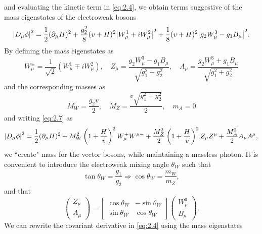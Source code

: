 and evaluating the kinetic term in \eqref{eq:2.4}, we obtain terms suggestive of the mass eigenstates of the electroweak bosons
\begin{equation}
    \label{eq:2.7}
    \abs{D_{\mu}\phi} ^2 = \frac{1}{2}(\partial_{\mu}H)^2 + \frac{g_2^2}{8}(v+H)^2\abs{W_{\mu}^1 + iW_{\mu}^2}^2 + \frac{1}{8}(v+H)^2\abs{g_2W_{\mu}^3-g_1B_{\mu}}^2.
\end{equation}
By defining the mass eigenstates as
\begin{equation}
    \label{eq:2.8}
    W^{\pm}_{\mu}= \frac{1}{\sqrt{2}}(W_{\mu}^1\mp iW_{\mu}^2), \quad Z_{\mu} = \frac{g_2W_{\mu}^3-g_1B_{\mu}}{\sqrt{g_1^2+g_2^2}}, \quad A_{\mu} = \frac{g_2W_{\mu}^3 + g_1B_{\mu}}{\sqrt{g_1^2+g_2^2}}
\end{equation}
and the corresponding masses as
\begin{equation}
    \label{eq:2.9}
    M_W = \frac{g_2v}{2}, \quad M_Z = \frac{v\sqrt{g_1^2+g_2^2}}{2}, \quad m_A = 0
\end{equation}
and writing \eqref{eq:2.7} as
\begin{equation}
    \label{eq:2.10}
    \abs{D_{\mu}\phi} ^2 = \frac{1}{2}(\partial_{\mu}H)^2 + M_W^2\left(1+\frac{H}{v}\right)^2W_{\mu}^{+}W^{\mu-} + \frac{M_Z^2}{2}\left(1+\frac{H}{v}\right)^2Z_{\mu}Z^{\mu} + \frac{M_A^2}{2}A_{\mu}A^{\mu},
\end{equation}
we ``create" mass for the vector bosons, while maintaining a massless photon. It is convenient to introduce the electroweak mixing angle $\theta_W$ such that
\begin{equation}
    \label{eq:2.11}
    \tan\theta_W = \frac{g_1}{g_2} \Rightarrow \cos\theta_W = \frac{m_W}{m_Z}, 
\end{equation}
and that
\begin{equation}
    \label{2.12}
    \begin{pmatrix}
        Z_{\mu} \\ A_{\mu}
    \end{pmatrix} = \begin{bmatrix}
        \cos\theta_W & -\sin\theta_W  \\ 
         \sin\theta_W & \cos\theta_W  
    \end{bmatrix} \begin{pmatrix}
        W_{\mu}^3 \\ B_{\mu}
    \end{pmatrix}.
\end{equation}
We can rewrite the covariant derivative in \eqref{eq:2.4} using the mass eigenstates
